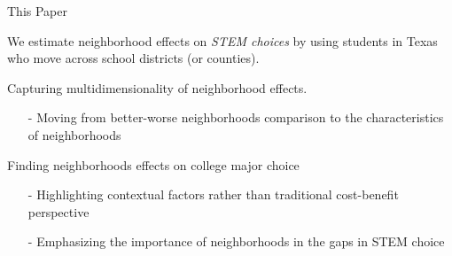 \documentclass[aspectratio=169,xcolor=dvipsnames]{beamer}
\newenvironment{wideitemize}{\itemize\addtolength{\itemsep}{10pt}}{\enditemize}
\begin{document}
\begin{frame}{This Paper}
\begin{wideitemize}
  \item We estimate neighborhood effects on \textit{STEM choices} by using students in Texas who move across school districts (or counties). 
  \pause
  
  \begin{wideitemize}
  \item Capturing multidimensionality of neighborhood effects. 
  \begin{itemize}
      \item[-] Moving from better-worse neighborhoods comparison to the characteristics of neighborhoods
  \end{itemize}
  \pause
  \item Finding neighborhoods effects on college major choice
  \begin{itemize}
      \item[-] Highlighting contextual factors rather than traditional cost-benefit perspective
      \item[-] Emphasizing the importance of neighborhoods in the gaps in STEM choice
  \end{itemize}
\end{wideitemize}

\end{wideitemize}
\end{frame}
\end{document}
